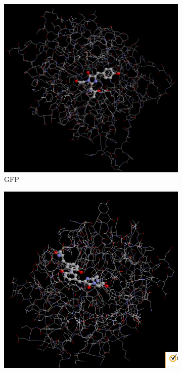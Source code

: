 \documentclass[a4paper,11pt, titlepage]{jsarticle}
\begin{document}
\begin{figure}[htbp]
  \centering
  \begin{subfigure}{0.3\columnwidth}
      \centering
      \includegraphics[width=\columnwidth]{GFP_close.png}
      \caption{GFP}
      \label{fig:GFP}
  \end{subfigure}
  \begin{subfigure}{0.3\columnwidth}
      \centering
      \includegraphics[width=\columnwidth]{YFP_close.png}

\end{subfigure}
\end{figure}
\end{document}
